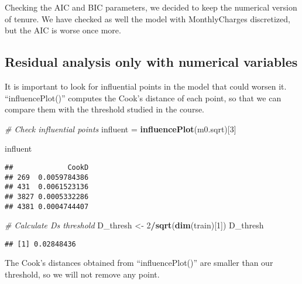 \documentclass[
]{article}
\newenvironment{Shaded}{\begin{snugshade}}{\end{snugshade}}
\newcommand{\CommentTok}[1]{\textcolor[rgb]{0.56,0.35,0.01}{\textit{#1}}}
\newcommand{\DecValTok}[1]{\textcolor[rgb]{0.00,0.00,0.81}{#1}}
\newcommand{\FunctionTok}[1]{\textcolor[rgb]{0.13,0.29,0.53}{\textbf{#1}}}
\newcommand{\NormalTok}[1]{#1}
\newcommand{\OtherTok}[1]{\textcolor[rgb]{0.56,0.35,0.01}{#1}}
\newcommand{\SpecialCharTok}[1]{\textcolor[rgb]{0.81,0.36,0.00}{\textbf{#1}}}
\begin{document}
Checking the AIC and BIC parameters, we decided to keep the numerical
version of tenure. We have checked as well the model with MonthlyCharges
discretized, but the AIC is worse once more.

\hypertarget{residual-analysis-only-with-numerical-variables}{%
\subsection{Residual analysis only with numerical
variables}\label{residual-analysis-only-with-numerical-variables}}

It is important to look for influential points in the model that could
worsen it. ``influencePlot()'' computes the Cook's distance of each
point, so that we can compare them with the threshold studied in the
course.

\begin{Shaded}
\begin{Highlighting}[]
\CommentTok{\# Check influential points}
\NormalTok{influent }\OtherTok{=} \FunctionTok{influencePlot}\NormalTok{(m0.sqrt)[}\DecValTok{3}\NormalTok{]}
\end{Highlighting}
\end{Shaded}

\begin{Shaded}
\begin{Highlighting}[]
\NormalTok{influent}
\end{Highlighting}
\end{Shaded}

\begin{verbatim}
##             CookD
## 269  0.0059784386
## 431  0.0061523136
## 3827 0.0005332286
## 4381 0.0004744407
\end{verbatim}

\begin{Shaded}
\begin{Highlighting}[]
\CommentTok{\# Calculate D\textquotesingle{}s threshold}
\NormalTok{D\_thresh }\OtherTok{\textless{}{-}} \DecValTok{2}\SpecialCharTok{/}\FunctionTok{sqrt}\NormalTok{(}\FunctionTok{dim}\NormalTok{(train)[}\DecValTok{1}\NormalTok{])}
\NormalTok{D\_thresh}
\end{Highlighting}
\end{Shaded}

\begin{verbatim}
## [1] 0.02848436
\end{verbatim}

The Cook's distances obtained from ``influencePlot()'' are smaller than
our threshold, so we will not remove any point.
\end{document}
